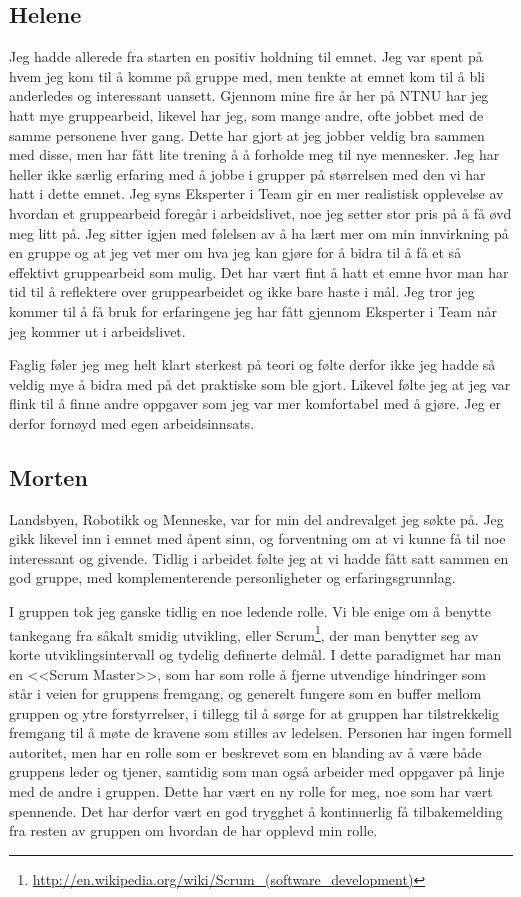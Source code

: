 \subsection{Helene}
Jeg hadde allerede fra starten en positiv holdning til emnet. Jeg var spent på hvem jeg kom til å komme på gruppe med, men tenkte at emnet kom til å bli anderledes og interessant uansett. Gjennom mine fire år her på NTNU har jeg hatt mye gruppearbeid, likevel har jeg, som mange andre, ofte jobbet med de samme personene hver gang. Dette har gjort at jeg jobber veldig bra sammen med disse, men har fått lite trening å å forholde meg til nye mennesker. Jeg har heller ikke særlig erfaring med å jobbe i grupper på størrelsen med den vi har hatt i dette emnet. Jeg syns Eksperter i Team gir en mer realistisk opplevelse av hvordan et gruppearbeid foregår i arbeidslivet, noe jeg setter stor pris på å få øvd meg litt på. Jeg sitter igjen med følelsen av å ha lært mer om min innvirkning på en gruppe og at jeg vet mer om hva jeg kan gjøre for å bidra til å få et så effektivt gruppearbeid som mulig. Det har vært fint å hatt et emne hvor man har tid til å reflektere over gruppearbeidet og ikke bare haste i mål. Jeg tror jeg kommer til å få bruk for erfaringene jeg har fått gjennom Eksperter i Team når jeg kommer ut i arbeidslivet. 

Faglig føler jeg meg helt klart sterkest på teori og følte derfor ikke jeg hadde så veldig mye å bidra med på det praktiske som ble gjort. Likevel følte jeg at jeg var flink til å finne andre oppgaver som jeg var mer komfortabel med å gjøre. Jeg er derfor fornøyd med egen arbeidsinnsats.

\subsection{Morten}
Landsbyen, Robotikk og Menneske, var for min del andrevalget jeg søkte på. Jeg gikk likevel inn i emnet med åpent sinn, og forventning om at vi kunne få til noe interessant og givende. Tidlig i arbeidet følte jeg at vi hadde fått satt sammen en god gruppe, med komplementerende personligheter og erfaringsgrunnlag.

I gruppen tok jeg ganske tidlig en noe ledende rolle. Vi ble enige om å benytte tankegang fra såkalt smidig utvikling, eller Scrum\footnote{\url{http://en.wikipedia.org/wiki/Scrum_(software_development)}}, der man benytter seg av korte utviklingsintervall og tydelig definerte delmål. I dette paradigmet har man en <<Scrum Master>>, som har som rolle å fjerne utvendige hindringer som står i veien for gruppens fremgang, og generelt fungere som en buffer mellom gruppen og ytre forstyrrelser, i tillegg til å sørge for at gruppen har tilstrekkelig fremgang til å møte de kravene som stilles av ledelsen. Personen har ingen formell autoritet, men har en rolle som er beskrevet som en blanding av å være både gruppens leder og tjener, samtidig som man også arbeider med oppgaver på linje med de andre i gruppen. Dette har vært en ny rolle for meg, noe som har vært spennende. Det har derfor vært en god trygghet å kontinuerlig få tilbakemelding fra resten av gruppen om hvordan de har opplevd min rolle.

